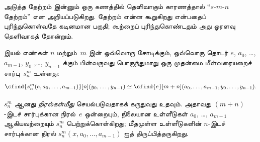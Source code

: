 \documentclass[../../../include/open-logic-section]{subfiles}
\begin{document}


\begin{explain}
அடுத்த தேற்றம் இன்னும் ஒரு கணத்தில் தெளிவாகும் காரணத்தால்
“$s$-$m$-$n$ தேற்றம்” என அறியப்படுகிறது. தேற்றம் என்ன கூறுகிறது
என்பதைப் புரிந்துகொள்வதே கடினமான பகுதி; கூற்றைப் புரிந்துகொண்டதும்
அது ஓரளவு தெளிவாகத் தோன்றும்.
\end{explain}

\begin{thm}
  இயல் எண்கள் $n$ மற்றும்~$m$ இன் ஒவ்வொரு சோடிக்கும், ஒவ்வொரு
  தொடர் $e$, $a_0$, \dots, $a_{m-1}$, $y_0$ ,\dots,
  $y_{n-1}$ க்கும் பின்வருவது பொருந்துமாறு ஒரு முதன்மை
  மீள்வரையறைச் சார்பு~$s^m_n$ உள்ளது:
  \[
  \cfind{s^m_n(e, a_0, \dots, a_{m-1})}[n](y_0, \dots, y_{n-1}) \simeq
  \cfind{e}[m+n](a_0, \dots, a_{m-1}, y_0, \dots, y_{n-1}).
  \]
\end{thm}

\begin{explain}
$s^m_n$ ஆனது \emph{நிரல்கள்மீது} செயல்படுவதாகக் கருதுவது உதவும்.
அதாவது $(m+n)$-இடச் சார்புக்கான நிரல்~$e$ ஒன்றையும், நிலையான
உள்ளீடுகள் $a_0$, \dots, $a_{m-1}$ ஆகியவற்றையும் $s^m_n$
பெற்றுக்கொள்கிறது; மீதமுள்ள உள்ளீடுகளின் $n$-இடச் சார்புக்கான
நிரல் $s^m_n(x, a_0, \dots, a_{m-1})$ ஐத் திருப்பித்தருகிறது.
\end{explain}
\end{document}
